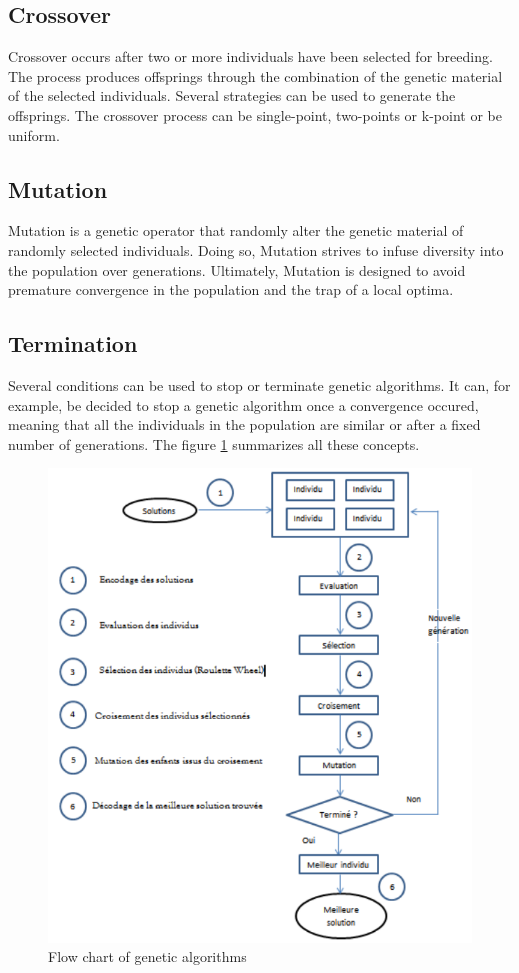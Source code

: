 \documentclass[twocolumn,10pt]{asme2ej}
\begin{document}
\subsection{Crossover}
Crossover occurs after two or more individuals have been selected for breeding. The process produces offsprings through the combination of the genetic material of the selected individuals. Several strategies can be used to generate the offsprings. The crossover process can be single-point, two-points or k-point or be uniform. 

\subsection{Mutation}

Mutation is a genetic operator that randomly alter the genetic material of randomly selected individuals. Doing so, Mutation strives to infuse diversity into the population over generations. Ultimately, Mutation is designed to avoid premature convergence in the population and the trap of a local optima.

\subsection{Termination}
Several conditions can be used to stop or terminate genetic algorithms. It can, for example, be decided to stop a genetic algorithm once a convergence occured, meaning that all the individuals in the population are similar or after a fixed number of generations. The figure \ref{fig:gaRepr} summarizes all these concepts. 

\begin{figure}[h]
    \centering
    \includegraphics[scale=.3]{figure/ga_repr.png}
    \caption{Flow chart of genetic algorithms}
    \label{fig:gaRepr}
\end{figure}
\end{document}
